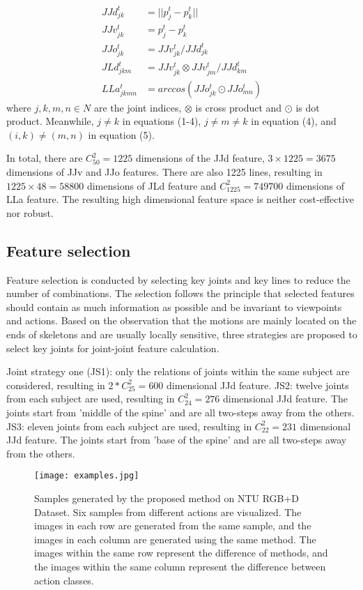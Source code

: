\documentclass[5pt]{article}
\begin{document}
\begin{align}
	JJd^t_{jk}& = ||p^t_j-p^t_k|| \\
	JJv^t_{jk} & =  p^t_j-p^t_k \\
	JJo^t_{jk} & =  JJv^t_{jk}/JJd^t_{jk}\\
	JLd^t_{jkm} & =  JJv^t_{jk}\otimes  JJv^t_{jm}/JJd^t_{km}\\
	LLa^t_{jkmn} & = arccos(JJo^t_{jk}\odot JJo^t_{mn})
\end{align}
where $j,k,m,n\in N$ are the joint indices, $\otimes$ is cross 
product and $\odot$ is dot product. Meanwhile, $j \neq k$ in equations 
(1-4), $j\neq m\neq k$ in equation (4), and $(i,k)\neq (m,n)$ in equation 
(5). 
	
In total, there are $C^2_{50}=1225$ dimensions of the JJd feature, 
$3 \times 1225=3675$ dimensions of JJv and JJo features. There are also 1225 
lines, resulting in $1225 \times 48=58800$ dimensions of JLd feature and 
$C^2_{1225}=749700 $ dimensions of LLa feature. The resulting high dimensional 
feature space is neither cost-effective nor robust.
	
\subsection{Feature selection}
Feature selection is conducted by selecting key joints and key lines to reduce 
the number of combinations. The selection follows the principle that selected 
features should contain as much information as possible and be invariant to 
viewpoints and actions. Based on the observation that the motions are mainly 
located on the ends of skeletons and are usually locally sensitive, three 
strategies are proposed to select key joints for joint-joint feature 
calculation. 
	
	
Joint strategy one (JS1): only the relations of joints within the same 
subject are considered, resulting in $2*C^2_{25}=600$ dimensional JJd feature. 
JS2: twelve joints from each subject are used, resulting in $C^2_{24}=276$ 
dimensional JJd feature. The joints start from 'middle of the spine' and are all 
two-steps away from the others.  JS3: eleven joints from each subject are used, 
resulting in $C^2_{22}=231$ dimensional JJd feature. The joints start from 
'base of the spine' and are all two-steps away from the others. 
	
	\begin{figure*}[!t]
		\centering
		\texttt{[image: examples.jpg]}
		\caption{Samples generated by the proposed method on NTU RGB+D 
Dataset. Six samples from different actions are visualized. The images in each 
row are generated from the same sample, and the images in each column are 
generated using the same method. The images within the same row represent the 
difference of methods, and the images within the same column represent the 
difference between action classes.}
		\label{fig:samples}
	\end{figure*}
	
\end{document}
